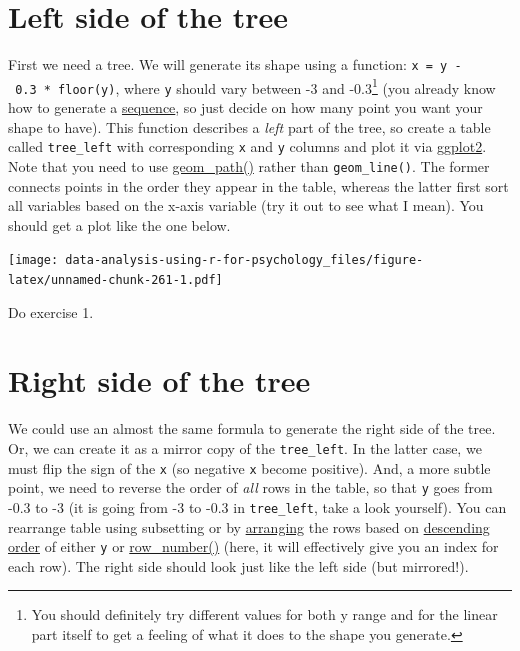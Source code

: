 \documentclass[
]{book}
\begin{document}
\hypertarget{left-side-of-the-tree}{%
\section{Left side of the tree}\label{left-side-of-the-tree}}

First we need a tree. We will generate its shape using a function: \texttt{x\ =\ y\ -\ 0.3\ *\ floor(y)}, where \texttt{y} should vary between -3 and -0.3\footnote{You should definitely try different values for both y range and for the linear part itself to get a feeling of what it does to the shape you generate.} (you already know how to generate a \href{https://stat.ethz.ch/R-manual/R-devel/library/base/html/seq.html}{sequence}, so just decide on how many point you want your shape to have). This function describes a \emph{left} part of the tree, so create a table called \texttt{tree\_left} with corresponding \texttt{x} and \texttt{y} columns and plot it via \href{https://ggplot2.tidyverse.org/}{ggplot2}. Note that you need to use \href{https://ggplot2.tidyverse.org/reference/geom_path.html}{geom\_path()} rather than \texttt{geom\_line()}. The former connects points in the order they appear in the table, whereas the latter first sort all variables based on the x-axis variable (try it out to see what I mean). You should get a plot like the one below.

\texttt{[image: data-analysis-using-r-for-psychology\_files/figure-latex/unnamed-chunk-261-1.pdf]}

Do exercise 1.

\hypertarget{right-side-of-the-tree}{%
\section{Right side of the tree}\label{right-side-of-the-tree}}

We could use an almost the same formula to generate the right side of the tree. Or, we can create it as a mirror copy of the \texttt{tree\_left}. In the latter case, we must flip the sign of the \texttt{x} (so negative \texttt{x} become positive). And, a more subtle point, we need to reverse the order of \emph{all} rows in the table, so that \texttt{y} goes from -0.3 to -3 (it is going from -3 to -0.3 in \texttt{tree\_left}, take a look yourself). You can rearrange table using subsetting or by \href{https://dplyr.tidyverse.org/reference/arrange.html}{arranging} the rows based on \href{https://dplyr.tidyverse.org/reference/desc.html?q=desc}{descending order} of either \texttt{y} or \href{https://dplyr.tidyverse.org/reference/ranking.html}{row\_number()} (here, it will effectively give you an index for each row). The right side should look just like the left side (but mirrored!).
\end{document}
